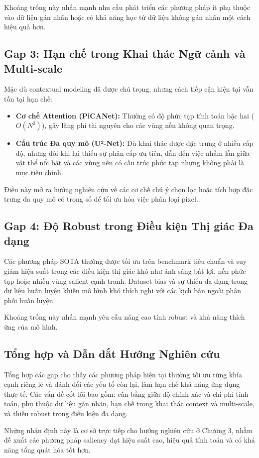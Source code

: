 Khoảng trống này nhấn mạnh nhu cầu phát triển các phương pháp ít phụ thuộc vào dữ liệu gán nhãn hoặc có khả năng học từ dữ liệu không gán nhãn một cách hiệu quả hơn.

\subsection{Gap 3: Hạn chế trong Khai thác Ngữ cảnh và Multi-scale}
Mặc dù contextual modeling đã được chú trọng, nhưng cách tiếp cận hiện tại vẫn tồn tại hạn chế:\begin{itemize}\item \textbf{Cơ chế Attention (PiCANet):} Thường có độ phức tạp tính toán bậc hai ($O(N^2)$), gây lãng phí tài nguyên cho các vùng nền không quan trọng.\item \textbf{Cấu trúc Đa quy mô (U²-Net):} Dù khai thác được đặc trưng ở nhiều cấp độ, nhưng đôi khi lại thiếu sự phân cấp ưu tiên, dẫn đến việc nhầm lẫn giữa vật thể nổi bật và các vùng nền có cấu trúc phức tạp nhưng không phải là mục tiêu chính.\end{itemize}

Điều này mở ra hướng nghiên cứu về các cơ chế chú ý chọn lọc hoặc tích hợp đặc trưng đa quy mô có trọng số để tối ưu hóa việc phân loại pixel..
\subsection{Gap 4: Độ Robust trong Điều kiện Thị giác Đa dạng}

Các phương pháp SOTA thường được tối ưu trên benchmark tiêu chuẩn và suy giảm hiệu suất trong các điều kiện thị giác khó như ánh sáng bất lợi, nền phức tạp hoặc nhiều vùng salient cạnh tranh. Dataset bias và sự thiếu đa dạng trong dữ liệu huấn luyện khiến mô hình khó thích nghi với các kịch bản ngoài phân phối huấn luyện.

Khoảng trống này nhấn mạnh yêu cầu nâng cao tính robust và khả năng thích ứng của mô hình.

\subsection{Tổng hợp và Dẫn dắt Hướng Nghiên cứu}

Tổng hợp các gap cho thấy các phương pháp hiện tại thường tối ưu từng khía cạnh riêng lẻ và đánh đổi các yếu tố còn lại, làm hạn chế khả năng ứng dụng thực tế. Các vấn đề cốt lõi bao gồm: cân bằng giữa độ chính xác và chi phí tính toán, phụ thuộc dữ liệu gán nhãn, hạn chế trong khai thác context và multi-scale, và thiếu robust trong điều kiện đa dạng.

Những nhận định này là cơ sở trực tiếp cho hướng nghiên cứu ở Chương 3, nhằm đề xuất các phương pháp saliency đạt hiệu suất cao, hiệu quả tính toán và có khả năng tổng quát hóa tốt hơn.
